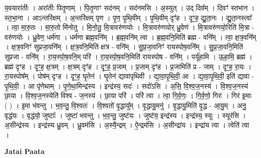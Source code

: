 \documentclass[17pt]{extarticle}
\begin{document}
य॒वयारा॑तीः । अरा॑तीः पितृ॒णाम् । पि॒तृ॒णाꣳ सद॑नम् । सद॑नमसि । अ॒स्युत् । उद् दिव᳚म् । दिवꣳ॑ स्तभान । स्त॒भा॒ना । आऽन्तरि॑क्षम् । अ॒न्तरि॑क्षम् पृण । पृ॒ण॒ पृ॒थि॒वीम् । पृ॒थि॒वीम् दृꣳ॑ह । दृꣳ॒॒ह॒ द्यु॒ता॒नः । द्यु॒ता॒नस्त्वा᳚ । त्वा॒ मा॒रु॒तः । मा॒रु॒तो मि॑नोतु । मि॒नो॒तु॒ मि॒त्रावरु॑णयोः । मि॒त्रावरु॑णयोर् ध्रु॒वेण॑ । मि॒त्रावरु॑णयो॒रिति॑ मि॒त्रा - वरु॑णयोः । ध्रु॒वेण॒ धर्म॑णा । धर्म॑णा ब्रह्म॒वनि᳚म् । ब्र॒ह्म॒वनि॑म् त्वा । ब्र॒ह्म॒वनि॒मिति॑ ब्रह्म - वनि᳚म् । त्वा॒ क्ष॒त्र॒वनि᳚म् । क्ष॒त्र॒वनिꣳ॑ 
सुप्रजा॒वनि᳚म् । क्ष॒त्र॒वनि॒मिति॑ क्षत्र - वनि᳚म् । सु॒प्र॒जा॒वनिꣳ॑ रायस्पोष॒वनि᳚म् । सु॒प्र॒जा॒वनि॒मिति॑ सुप्रजा - वनि᳚म् । रा॒य॒स्पो॒ष॒वनि॒म् परि॑ । रा॒य॒स्पो॒ष॒वनि॒मिति॑ रायस्पोष - वनि᳚म् । पर्यू॑हामि । ऊ॒हा॒मि॒ ब्रह्म॑ । ब्रह्म॑ दृꣳह । दृꣳ॒॒ह॒ क्ष॒त्रम् । क्ष॒त्रम् दृꣳ॑ह । दृꣳ॒॒ह॒ प्र॒जाम् । प्र॒जाम् दृꣳ॑ह । प्र॒जामिति॑ प्र - जाम् । दृꣳ॒॒ह॒ रा॒यः । रा॒यस्पोष᳚म् । पोष॑म् दृꣳह । दृꣳ॒॒ह॒ घृ॒तेन॑ । घृ॒तेन॑ द्यावापृथिवी । द्या॒वा॒पृ॒थि॒वी॒ आ । द्या॒वा॒पृ॒थि॒वी॒ इति॑ द्यावा - पृ॒थि॒वी॒ । आ पृ॑णेथाम् । पृ॒णे॒था॒मिन्द्र॑स्य । इन्द्र॑स्य॒ सदः॑ । सदो॑ऽसि । अ॒सि॒ वि॒श्व॒ज॒नस्य॑ । वि॒श्व॒ज॒नस्य॑ छा॒या । वि॒श्व॒ज॒नस्येति॑ विश्व - ज॒नस्य॑ । छा॒या परि॑ । परि॑ त्वा । त्वा॒ गि॒र्व॒णः॒ । गि॒र्व॒णो॒ गिरः॑ । गिर॑ इ॒माः ( ) । इ॒मा भ॑वन्तु । भ॒व॒न्तु॒ वि॒श्वतः॑ । वि॒श्वतो॑ वृ॒द्धायु᳚म् । वृ॒द्धायु॒मनु॑ । वृ॒द्धायु॒मिति॑ वृ॒द्ध - आ॒यु॒म् । अनु॒ वृद्ध॑यः । वृद्ध॑यो॒ जुष्टाः᳚ । जुष्टा॑ भवन्तु । भ॒व॒न्तु॒ जुष्ट॑यः । जुष्ट॑य॒ इन्द्र॑स्य । इन्द्र॑स्य॒ स्यूः । स्यूर॑सि । अ॒सीन्द्र॑स्य । इन्द्र॑स्य ध्रु॒वम् । ध्रु॒वम॑सि । अ॒स्यै॒न्द्रम् । ऐ॒न्द्रम॑सि । अ॒सीन्द्रा॑य । इन्द्रा॑य त्वा । त्वेति॑ त्वा । \newline

\textbf{Jatai Paata} \newline
\end{document}
